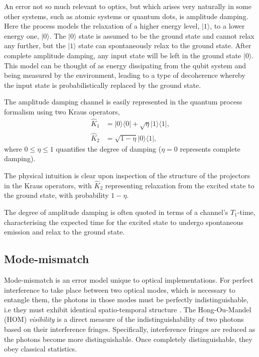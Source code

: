 \documentclass[aps,rmp,twocolumn,amsmath,amssymb,nofootinbib,superscriptaddress,longbibliography,floatfix]{revtex4-1}
\newcommand{\bra}[1]{\langle#1|}
\newcommand{\ket}[1]{|#1\rangle}
\begin{document}
An error not so much relevant to optics, but which arises very naturally in some other systems, such as atomic systems or quantum dots, is amplitude damping. Here the process models the relaxation of a higher energy level, $\ket{1}$, to a lower energy one, $\ket{0}$. The $\ket{0}$ state is assumed to be the ground state and cannot relax any further, but the $\ket{1}$ state can spontaneously relax to the ground state. After complete amplitude damping, any input state will be left in the ground state $\ket{0}$. This model can be thought of as energy dissipating from the qubit system and being measured by the environment, leading to a type of decoherence whereby the input state is probabilistically replaced by the ground state.

The amplitude damping channel is easily represented in the quantum process formalism using two Kraus operators,
\begin{align}
\hat{K}_1 &= \ket{0}\bra{0} + \sqrt\eta\ket{1}\bra{1}, \nonumber \\
\hat{K}_2 &= \sqrt{1-\eta}\ket{0}\bra{1}, 
\end{align}
where \mbox{$0\leq\eta\leq 1$} quantifies the degree of damping (\mbox{$\eta=0$} represents complete damping).

The physical intuition is clear upon inspection of the structure of the projectors in the Kraus operators, with $\hat{K}_2$ representing relaxation from the excited state to the ground state, with probability \mbox{$1-\eta$}.

The degree of amplitude damping is often quoted in terms of a channel's $T_1$-time, characterising the expected time for the excited state to undergo spontaneous emission and relax to the ground state.

%
%

\subsection{Mode-mismatch} \label{sec:MM_error}

Mode-mismatch is an error model unique to optical implementations. For perfect interference to take place between two optical modes, which is necessary to entangle them, the photons in those modes must be perfectly indistinguishable, i.e they must exhibit identical spatio-temporal structure \cite{bib:RohdeMauererSilberhorn07}. The Hong-Ou-Mandel (HOM) \cite{bib:HOM87} \emph{visibility} is a direct measure of the indistinguishability of two photons based on their interference fringes. Specifically, interference fringes are reduced as the photons become more distinguishable. Once completely distinguishable, they obey classical statistics.
\end{document}
